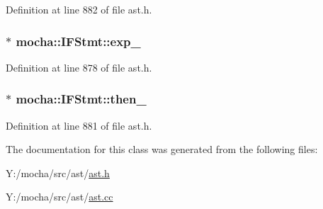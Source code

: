 Definition at line 882 of file ast.h.

\hypertarget{classmocha_1_1_i_f_stmt_aa710b83ea9cc7163eb831a7c950ed193}{
\subsubsection[{exp\_\-}]{$\ast$ {\bf mocha::IFStmt::exp\_\-}}}
\label{classmocha_1_1_i_f_stmt_aa710b83ea9cc7163eb831a7c950ed193}


Definition at line 878 of file ast.h.

\hypertarget{classmocha_1_1_i_f_stmt_aec15abfd3458f3b54ff132b9c6108120}{
\subsubsection[{then\_\-}]{$\ast$ {\bf mocha::IFStmt::then\_\-}}}
\label{classmocha_1_1_i_f_stmt_aec15abfd3458f3b54ff132b9c6108120}


Definition at line 881 of file ast.h.



The documentation for this class was generated from the following files:\begin{DoxyCompactItemize}
\item 
Y:/mocha/src/ast/\hyperlink{ast_8h}{ast.h}\item 
Y:/mocha/src/ast/\hyperlink{ast_8cc}{ast.cc}\end{DoxyCompactItemize}
